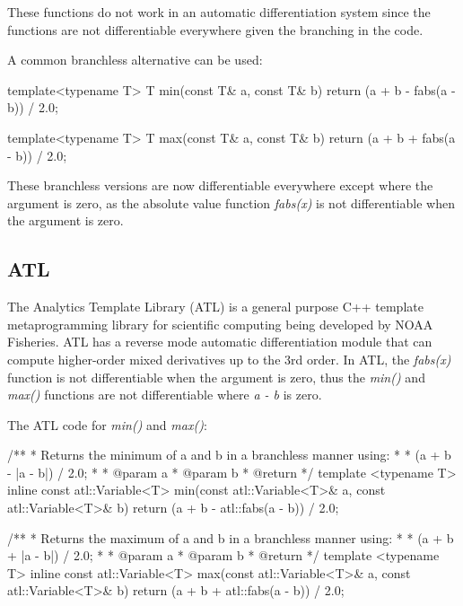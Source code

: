 \documentclass[oneside]{article}
\begin{document}
These functions do not work in an automatic differentiation system since the functions are not differentiable everywhere given the branching in the code.

A common branchless alternative can be used:

\begin{cppsource}
template<typename T>
T min(const T& a, const T& b){
   return (a + b - fabs(a - b)) / 2.0;
}

template<typename T>
T max(const T& a, const T& b){
   return (a + b + fabs(a - b)) / 2.0;
}
\end{cppsource}

These branchless versions are now differentiable everywhere except where the argument is zero, as the absolute value function \textit{fabs(x)} is not differentiable when the argument is zero.

\subsection{ATL}

The Analytics Template Library (ATL) is a general purpose C++ template metaprogramming library for scientific computing being developed by NOAA Fisheries. ATL has a reverse mode automatic differentiation module that can compute higher-order mixed derivatives up to the 3rd order. In ATL, the \textit{fabs(x)} function is not differentiable when the argument is zero, thus the \textit{min()} and \textit{max()} functions are not differentiable where \textit{a - b} is zero.

The ATL code for \textit{min()} and \textit{max()}:

\begin{cppsource}

/**
 * Returns the minimum of a and b in a branchless manner using:
 *
 * (a + b - |a - b|) / 2.0;
 *
 * @param a
 * @param b
 * @return
 */
template <typename T>
inline const atl::Variable<T> min(const atl::Variable<T>& a,
	const atl::Variable<T>& b) {
    return (a + b - atl::fabs(a - b)) / 2.0;
}

/**
 * Returns the maximum of a and b in a branchless manner using:
 *
 * (a + b + |a - b|) / 2.0;
 *
 * @param a
 * @param b
 * @return
 */
template <typename T>
inline const atl::Variable<T> max(const atl::Variable<T>& a,
	const atl::Variable<T>& b) {
    return (a + b + atl::fabs(a - b)) / 2.0;
}


\end{cppsource}
\end{document}
